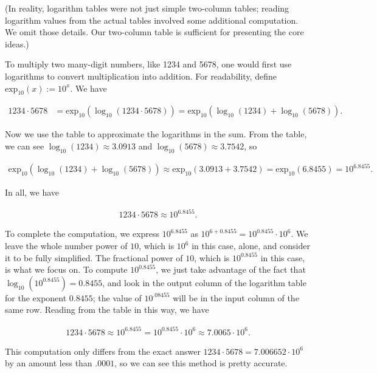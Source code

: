 (In reality, logarithm tables were not just simple two-column tables; reading logarithm values from the actual tables involved some additional computation. We omit those details. Our two-column table is sufficient for presenting the core ideas.)

To multiply two many-digit numbers, like 1234 and 5678, one would first use logarithms to convert multiplication into addition. For readability, define $\text{exp}_{10}(x) := 10^x$. We have

\begin{align*}
    1234 \cdot 5678 &= \text{exp}_{10}(\log_{10}(1234 \cdot 5678)) = \text{exp}_{10}(\log_{10}(1234) + \log_{10}(5678)).
\end{align*}

Now we use the table to approximate the logarithms in the sum. From the table, we can see $\log_{10}(1234) \approx 3.0913$ and $\log_{10}(5678) \approx 3.7542$, so

\begin{align*}
    \text{exp}_{10}(\log_{10}(1234) + \log_{10}(5678)) \approx \text{exp}_{10}(3.0913 + 3.7542) = \text{exp}_{10}(6.8455) = 10^{6.8455}.
\end{align*}

In all, we have

\begin{align*}
    1234 \cdot 5678 \approx 10^{6.8455}.
\end{align*}

To complete the computation, we express $10^{6.8455}$ as $10^{6 + 0.8455} = 10^{0.8455} \cdot 10^6$. We leave the whole number power of $10$, which is $10^6$ in this case, alone, and consider it to be fully simplified. The fractional power of $10$, which is $10^{0.8455}$ in this case, is what we focus on. To compute $10^{0.8455}$, we just take advantage of the fact that $\log_{10}(10^{0.8455}) = 0.8455$, and look in the output column of the logarithm table for the exponent $0.8455$; the value of $10^{.08455}$ will be in the input column of the same row. Reading from the table in this way, we have

\begin{align*}
    1234 \cdot 5678 \approx 10^{6.8455} = 10^{0.8455} \cdot 10^6 \approx 7.0065 \cdot 10^6.
\end{align*}

This computation only differs from the exact answer $1234 \cdot 5678 = 7.006652 \cdot 10^6$ by an amount less than $.0001$, so we can see this method is pretty accurate.

